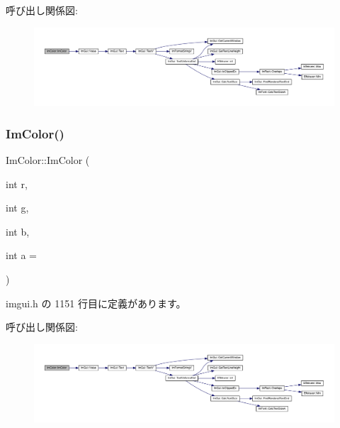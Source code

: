 呼び出し関係図\+:\nopagebreak
\begin{figure}[H]
\begin{center}
\leavevmode
\includegraphics[width=350pt]{struct_im_color_a95206b688dcc03f725790538c74f4526_cgraph}
\end{center}
\end{figure}
\mbox{\label{struct_im_color_ab4ba02f8290d5dadc1ebc57b2c8a9cbe}} 
\subsubsection{\texorpdfstring{Im\+Color()}{ImColor()}\hspace{0.1cm}{\footnotesize\ttfamily [2/5]}}
{\footnotesize\ttfamily Im\+Color\+::\+Im\+Color (\begin{DoxyParamCaption}\item[{int}]{r,  }\item[{int}]{g,  }\item[{int}]{b,  }\item[{int}]{a = {} }\end{DoxyParamCaption})\hspace{0.3cm}{\ttfamily [inline]}}



 imgui.\+h の 1151 行目に定義があります。

呼び出し関係図\+:\nopagebreak
\begin{figure}[H]
\begin{center}
\leavevmode
\includegraphics[width=350pt]{struct_im_color_ab4ba02f8290d5dadc1ebc57b2c8a9cbe_cgraph}
\end{center}
\end{figure}
\mbox{\label{struct_im_color_ad306332841a2b1f903f40262a19f9412}} 
